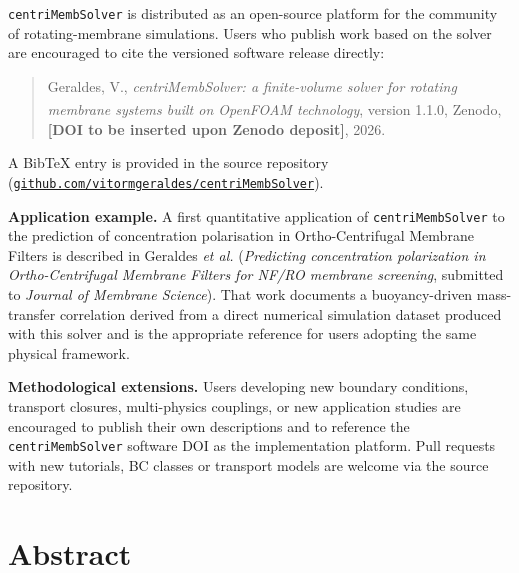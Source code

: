 \documentclass[11pt,a4paper]{article}
\begin{document}
	\noindent
	\texttt{centriMembSolver} is distributed as an open-source platform for
	the community of rotating-membrane simulations.  Users who publish work
	based on the solver are encouraged to cite the versioned software
	release directly:

	\begin{quote}
		Geraldes, V., \emph{centriMembSolver: a finite-volume solver for
		rotating membrane systems built on OpenFOAM\textsuperscript{\textregistered}
		technology}, version 1.1.0, Zenodo,
		\textbf{[DOI to be inserted upon Zenodo deposit]}, 2026.
	\end{quote}

	A BibTeX entry is provided in the source repository
	(\href{https://github.com/vitormgeraldes/centriMembSolver}{\texttt{github.com/vitormgeraldes/centriMembSolver}}).

	\medskip
	\noindent
	\textbf{Application example.}  A first quantitative application of
	\texttt{centriMembSolver} to the prediction of concentration
	polarisation in Ortho-Centrifugal Membrane Filters is described in
	Geraldes \emph{et al.} (\emph{Predicting concentration polarization
	in Ortho-Centrifugal Membrane Filters for NF/RO membrane screening},
	submitted to \emph{Journal of Membrane Science}).  That work
	documents a buoyancy-driven mass-transfer correlation derived from a
	direct numerical simulation dataset produced with this solver and is
	the appropriate reference for users adopting the same physical
	framework.

	\medskip
	\noindent
	\textbf{Methodological extensions.}  Users developing new boundary
	conditions, transport closures, multi-physics couplings, or new
	application studies are encouraged to publish their own descriptions
	and to reference the \texttt{centriMembSolver} software DOI as the
	implementation platform.  Pull requests with new tutorials, BC
	classes or transport models are welcome via the source repository.

	\clearpage
	\thispagestyle{plain}

	\section*{Abstract}
	
\end{document}
